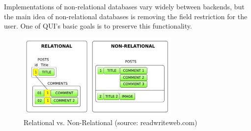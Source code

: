 \documentclass{article} %
\begin{document}
Implementations of non-relational databases vary widely between backends, but the main idea of non-relational databases is removing the field restriction for the user.
One of QUI's basic goals is to preserve this functionality. 
\begin{figure}[htb]
\centering
\includegraphics[width=300px]{RelNonRel}
\caption{Relational vs. Non-Relational (source: readwriteweb.com) }
\label{fig:reltab}
\end{figure}
\end{document}
